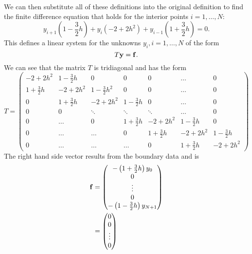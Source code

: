 \documentclass[10pt]{article}
\begin{document}
\begin{enumerate}
  We can then substitute all of these definitions into the original
  definition to find the finite difference equation that holds for the
  interior points $i = 1, \dots, N$:
  \begin{equation*}
    y_{i+1} \left( 1 - \frac{3}{2} h \right) + y_i \left( -2 + 2 h^2 \right)
    + y_{i-1} \left( 1 + \frac{3}{2} h \right) = 0.
  \end{equation*}
  This defines a linear system for the unknowns $y_i, i = 1, \dots, N$
  of the form
  \begin{equation*}
    T {\bf y} = {\bf f}.
  \end{equation*}
  We can see that the matrix $T$ is tridiagonal and has the form
  \begin{equation*}
    T =
    \begin{pmatrix}
      -2 + 2 h^2 & 1 - \tfrac{3}{2} h & 0 & 0 & 0 & \dots & 0 \\
      1 + \tfrac{3}{2} h & -2 + 2 h^2 & 1 - \tfrac{3}{2} h^2 & 0 & 0 & \dots
      & 0 \\
      0 & 1 + \tfrac{3}{2} h & -2 + 2 h^2 & 1 - \tfrac{3}{2} h & 0 & \dots
      & 0 \\
      0 & 0 & \ddots & \ddots & \ddots & \dots & 0 \\
      0 & \dots & 0 & 1 + \tfrac{3}{2} h & -2 + 2 h^2 & 1 - \tfrac{3}{2} h
      & 0 \\
      0 & \dots & \dots & 0 & 1 + \tfrac{3}{2} h & -2 + 2 h^2 & 1 - \tfrac{3}{2}
      h \\
      0 & \dots & \dots & \dots & 0 & 1 + \tfrac{3}{2} h & -2 + 2 h^2
    \end{pmatrix}
  \end{equation*}
  The right hand side vector results from the boundary data and is
  \begin{align*}
    {\bf f} & =
    \begin{pmatrix}
      - \left( 1 + \tfrac{3}{2} h \right) y_0 \\
      0 \\
      \vdots \\
      0 \\
      - \left( 1 - \tfrac{3}{2} h \right) y_{N+1}
    \end{pmatrix} \\
    & =
    \begin{pmatrix}
      0 \\
      0 \\
      \vdots \\
      0 \\

\end{pmatrix}
\end{align*}
\end{enumerate}
\end{document}
